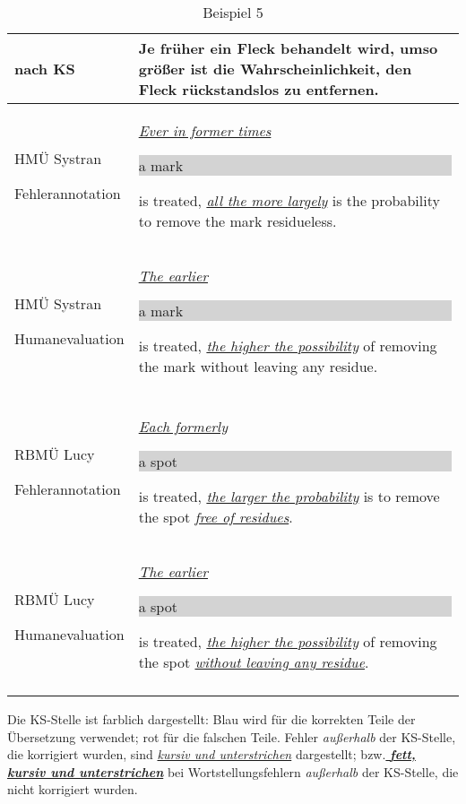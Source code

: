 \documentclass[output=paper]{langscibook}
\begin{document}
\begin{table}
    \begin{tabularx}{\textwidth}{p{}Q}
\lsptoprule
\textbf{nach KS} & Je früher ein Fleck behandelt wird, umso größer ist die Wahrscheinlichkeit, \textbf{den Fleck} rückstandslos zu entfernen.\\
\midrule
HMÜ Systran

Fehlerannotation &  \ul{\textit{Ever in former times}} \colorbox{lightgray}{a mark\strut} is treated, \ul{\textit{all the more largely}} is the probability to remove {\color{blue}the mark} residueless.\\
\tablevspace
HMÜ Systran

Humanevaluation & \ul{\textit{The earlier}} \colorbox{lightgray}{a mark\strut\strut} is treated, \ul{\textit{the higher the possibility}} of removing {\color{blue}the mark} without leaving any residue.\\
& \\
RBMÜ Lucy

Fehlerannotation & \ul{\textit{Each formerly}} \colorbox{lightgray}{a spot\strut} is treated, \ul{\textit{the larger the probability}} is to remove {\color{blue}the spot} \ul{\textit{free of residues}}.\\
\tablevspace
RBMÜ Lucy

Humanevaluation & \ul{\textit{The earlier}} \colorbox{lightgray}{a spot\strut} is treated, \ul{\textit{the higher the possibility}} of removing {\color{blue}the spot} \ul{\textit{without leaving any residue}}.\\
\lspbottomrule
    \end{tabularx}
    \caption{Beispiel 5}
    \label{tabex:5}
    \parbox{\textwidth}{\raggedright\footnotesize\noindent
Die KS-Stelle ist farblich dargestellt: {\color{blue} Blau} wird für die korrekten Teile der Übersetzung verwendet; {\color{red} rot} für die falschen Teile.
Fehler \textit{außerhalb} der KS-Stelle, die korrigiert wurden, sind \ul{\textit{kursiv und unterstrichen}} dargestellt; bzw.\ul{\textit{ \textbf{fett, kursiv und unterstrichen}}} bei Wortstellungsfehlern \textit{außerhalb} der KS-Stelle, die nicht korrigiert wurden.
}

\end{table}
\end{document}
